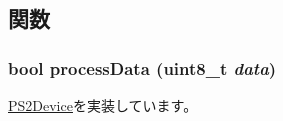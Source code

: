 \subsection{関数}
\hypertarget{classX86ISA_1_1PS2Keyboard_a501fdeaf8d614f432cfbf95f23675982}{
\subsubsection[{processData}]{\setlength{\rightskip}{0pt plus 5cm}bool processData (uint8\_\-t {\em data})}}
\label{classX86ISA_1_1PS2Keyboard_a501fdeaf8d614f432cfbf95f23675982}


\hyperlink{classX86ISA_1_1PS2Device_a7bfab1b5725d41896d0cd06793244ab7}{PS2Device}を実装しています。


